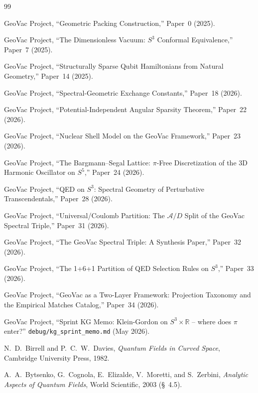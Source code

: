 \documentclass[11pt]{article}
\begin{document}
\begin{thebibliography}{99}

GeoVac Project, ``Geometric Packing Construction,'' Paper~0 (2025).

GeoVac Project, ``The Dimensionless Vacuum: $S^3$ Conformal
Equivalence,'' Paper~7 (2025).

GeoVac Project, ``Structurally Sparse Qubit Hamiltonians from Natural
Geometry,'' Paper~14 (2025).

GeoVac Project, ``Spectral-Geometric Exchange Constants,'' Paper~18
(2026).

GeoVac Project, ``Potential-Independent Angular Sparsity Theorem,''
Paper~22 (2026).

GeoVac Project, ``Nuclear Shell Model on the GeoVac Framework,''
Paper~23 (2026).

GeoVac Project, ``The Bargmann--Segal Lattice: $\pi$-Free
Discretization of the 3D Harmonic Oscillator on $S^5$,'' Paper~24
(2026).

GeoVac Project, ``QED on $S^3$: Spectral Geometry of Perturbative
Transcendentals,'' Paper~28 (2026).

GeoVac Project, ``Universal/Coulomb Partition: The $\mathcal{A}/D$
Split of the GeoVac Spectral Triple,'' Paper~31 (2026).

GeoVac Project, ``The GeoVac Spectral Triple: A Synthesis Paper,''
Paper~32 (2026).

GeoVac Project, ``The 1+6+1 Partition of QED Selection Rules
on $S^3$,'' Paper~33 (2026).

GeoVac Project, ``GeoVac as a Two-Layer Framework: Projection
Taxonomy and the Empirical Matches Catalog,'' Paper~34 (2026).

GeoVac Project, ``Sprint KG Memo: Klein-Gordon on $S^3 \times
\mathbb{R}$ -- where does $\pi$ enter?''
\texttt{debug/kg\_sprint\_memo.md} (May 2026).

N.~D.~Birrell and P.~C.~W.~Davies,
\textit{Quantum Fields in Curved Space},
Cambridge University Press, 1982.

A.~A.~Bytsenko, G.~Cognola, E.~Elizalde, V.~Moretti, and S.~Zerbini,
\textit{Analytic Aspects of Quantum Fields},
World Scientific, 2003 (\S~4.5).


\end{thebibliography}
\end{document}
